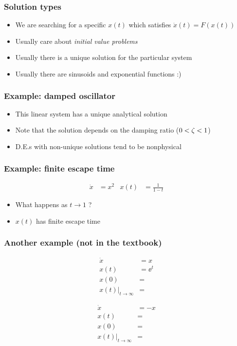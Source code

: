 \documentclass{beamer-control}
\begin{document}
\begin{frame}
\frametitle{Solution types}
\begin{itemize}
\item We are searching for a specific $x(t)$ which satisfies $\dot x(t)=F(x(t))$
\item Usually care about \emph{initial value problems}
\item Usually there is a unique solution for the particular system
\item Usually there are sinusoids and exponential functions :)
\end{itemize}
\end{frame}

\begin{frame}
\frametitle{Example: damped oscillator}
\begin{itemize}
\item This linear system has a unique analytical solution
\item Note that the solution depends on the damping ratio ($0<\zeta<1$)
\item D.E.s with non-unique solutions tend to be nonphysical
\end{itemize}
\end{frame}

\begin{frame}
\frametitle{Example: finite escape time}
\begin{align}
\dot x &= x^2 & x(t) &= \frac{1}{1-t}
\end{align}
\begin{itemize}
\item What happens as $t\to1$ ?
\item $x(t)$ has finite escape time
\end{itemize}
\end{frame}

\begin{frame}
\frametitle{Another example (not in the textbook)}
\begin{align}
\dot x &= x \\
x(t)   &= \ee^{t} \\
x(0)   &= \\
x(t)|_{t\to\infty}&=
\end{align}

\vfill
\hrulefill
\vfill

\begin{align}
\dot x &= -x \\
x(t)   &=  \\
x(0)   &= \\
x(t)|_{t\to\infty}&=
\end{align}
\end{frame}


\SUMMARYFRAME
\FINALE
\end{document}
